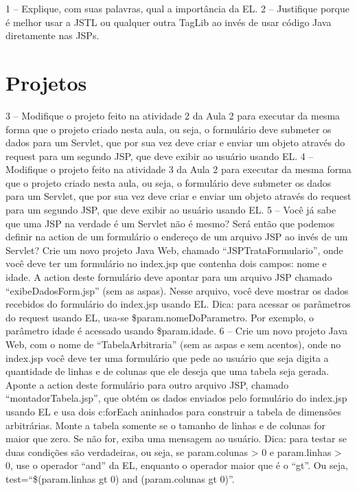 1 – Explique, com suas palavras, qual a importância da EL.
2 – Justifique porque é melhor usar a JSTL ou qualquer outra TagLib ao invés de usar código Java diretamente nas JSPs.

\section{Projetos}

3 – Modifique o projeto feito na atividade 2 da Aula 2 para executar da mesma forma que o projeto criado nesta aula, ou seja, o formulário deve submeter os dados para um Servlet, que por sua vez deve criar e enviar um objeto através do request para um segundo JSP, que deve exibir ao usuário usando EL.
4 – Modifique o projeto feito na atividade 3 da Aula 2 para executar da mesma forma que o projeto criado nesta aula, ou seja, o formulário deve submeter os dados para um Servlet, que por sua vez deve criar e enviar um objeto através do request para um segundo JSP, que deve exibir ao usuário usando EL.
5 – Você já sabe que uma JSP na verdade é um Servlet não é mesmo? Será então que podemos definir na action de um formulário o endereço de um arquivo JSP ao invés de um Servlet? Crie um novo projeto Java Web, chamado “JSPTrataFormulario”, onde você deve ter um formulário no index.jsp que contenha dois campos: nome e idade. A action deste formulário deve apontar para um arquivo JSP chamado “exibeDadosForm.jsp” (sem as aspas). Nesse arquivo, você deve mostrar os dados recebidos do formulário do index.jsp usando EL. Dica: para acessar os parâmetros do request usando EL, usa-se \${param.nomeDoParametro}. Por exemplo, o parâmetro idade é acessado usando \${param.idade}.
6 – Crie um novo projeto Java Web, com o nome de “TabelaArbitraria” (sem as aspas e sem acentos), onde no index.jsp você deve ter uma formulário que pede ao usuário que seja digita a quantidade de linhas e de colunas que ele deseja que uma tabela seja gerada. Aponte a action deste formulário para outro arquivo JSP, chamado “montadorTabela.jsp”, que obtém os dados enviados pelo formulário do index.jsp usando EL e usa dois c:forEach aninhados para construir a tabela de dimensões arbitrárias. Monte a tabela somente se o tamanho de linhas e de colunas for maior que zero. Se não for, exiba uma mensagem ao usuário. Dica: para testar se duas condições são verdadeiras, ou seja, se param.colunas > 0 e param.linhas > 0, use o operador “and” da EL, enquanto o operador maior que é o “gt”. Ou seja, test=“\${(param.linhas gt 0) and (param.colunas gt 0)}”.
